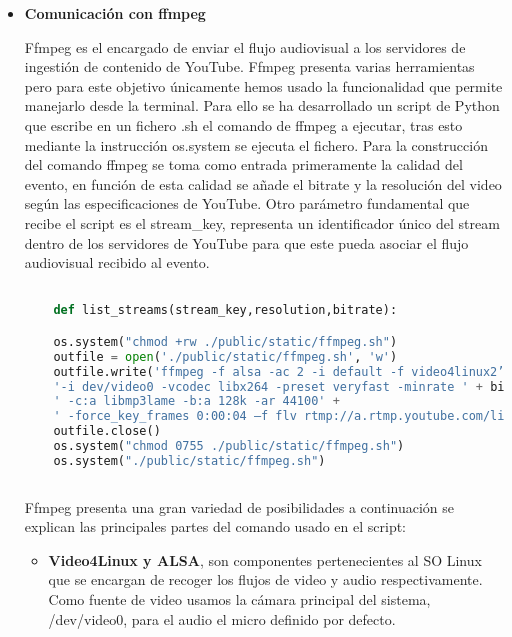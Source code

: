 \begin{itemize}
\begin{lstlisting}[language = Python]
    \end{lstlisting}
    
    
    \item \textbf{Comunicación con ffmpeg}
    
    Ffmpeg es el encargado de enviar el flujo audiovisual a los servidores de ingestión de contenido de YouTube. Ffmpeg presenta varias herramientas pero para este objetivo únicamente hemos usado la funcionalidad que permite manejarlo desde la terminal. Para ello se ha desarrollado un script de Python que escribe en un fichero .sh el comando de ffmpeg a ejecutar, tras esto mediante la instrucción os.system se ejecuta el fichero. Para la construcción del comando ffmpeg se toma como entrada primeramente la calidad del evento, en función de esta calidad se añade el bitrate y la resolución del video según las especificaciones de YouTube. Otro parámetro fundamental que recibe el script es el stream\_key, representa un identificador único del stream dentro de los servidores de YouTube para que este pueda asociar el flujo audiovisual recibido al evento.
    
    \begin{lstlisting}[language = Python]

    def list_streams(stream_key,resolution,bitrate):

    os.system("chmod +rw ./public/static/ffmpeg.sh")
    outfile = open('./public/static/ffmpeg.sh', 'w') 
    outfile.write('ffmpeg -f alsa -ac 2 -i default -f video4linux2’+ ‘-framerate 15 -video_size ' + resolution +
    '-i dev/video0 -vcodec libx264 -preset veryfast -minrate ' + bitrate  + '-maxrate 1000k -bufsize 1000k' +' -vf "format=yuv420p"  -g  30 ' + '-vf drawtext= "fontfile=/usr/share/fonts/truetype/freefont/FreeSerif.ttf:’+ ‘fontsize=24:''fontcolor=yellow:textfile=./public/static/subtitles.txt:reload=1 :x=100:y=50"' +
    ' -c:a libmp3lame -b:a 128k -ar 44100' +
    ' -force_key_frames 0:00:04 –f flv rtmp://a.rtmp.youtube.com/live2/' + Stream_key                 
    outfile.close()
    os.system("chmod 0755 ./public/static/ffmpeg.sh")
    os.system("./public/static/ffmpeg.sh")
    
    \end{lstlisting}
    
    Ffmpeg presenta una gran variedad de posibilidades a continuación se explican las principales partes del comando usado en el script:
    
    \begin{itemize}
        \item \textbf{Video4Linux y ALSA}, son componentes pertenecientes al SO Linux que se encargan de recoger los flujos de video y audio respectivamente. Como fuente de video usamos la cámara principal del sistema, /dev/video0, para el audio el micro definido por defecto.
        

\end{itemize}
\end{itemize}
